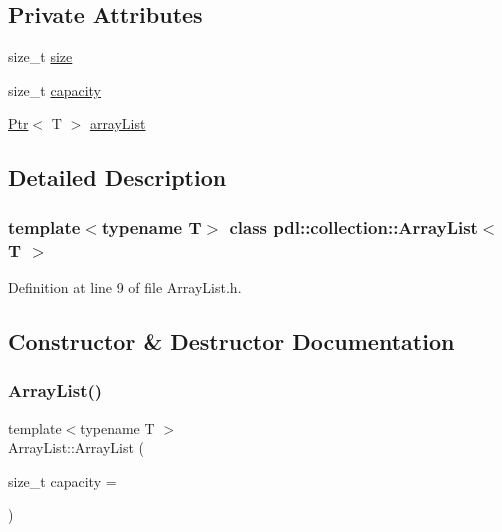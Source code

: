 \subsection*{Private Attributes}
\begin{DoxyCompactItemize}
\item 
size\+\_\+t \mbox{\hyperlink{classpdl_1_1collection_1_1_array_list_a3406722503a3df38feb4fbfee18c25d0}{size}}
\item 
size\+\_\+t \mbox{\hyperlink{classpdl_1_1collection_1_1_array_list_a26805e3d3d40d6c2fcdf1f033e06c94b}{capacity}}
\item 
\mbox{\hyperlink{classpdl_1_1memory_1_1_ptr}{Ptr}}$<$ T $>$ \mbox{\hyperlink{classpdl_1_1collection_1_1_array_list_a8ba11c012c623d0abfc9d8c865c91403}{array\+List}}
\end{DoxyCompactItemize}


\subsection{Detailed Description}
\subsubsection*{template$<$typename T$>$\newline
class pdl\+::collection\+::\+Array\+List$<$ T $>$}



Definition at line 9 of file Array\+List.\+h.



\subsection{Constructor \& Destructor Documentation}
\mbox{\label{classpdl_1_1collection_1_1_array_list_aa535c7a760f1ddf3c476825033adf7d0}} 
\subsubsection{\texorpdfstring{ArrayList()}{ArrayList()}}
{\footnotesize\ttfamily template$<$typename T $>$ \\
Array\+List\+::\+Array\+List (\begin{DoxyParamCaption}\item[{size\+\_\+t}]{capacity = {} }\end{DoxyParamCaption})}



